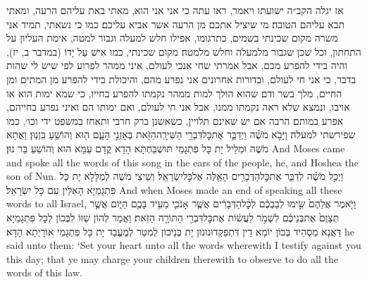 {\quad {} אז יגלה הקב״ה ישועתו ויאמר, ראו עתה כי אני אני הוא, מאתי באת עליהם הרעה, ומאתי תבא עליהם הטובה׃\quad {} מי שיציל אתכם מן הרעה אשר אביא עליכם׃\quad {} כמו כי נשאתי, תמיד אני משרה מקום שכינתי בשמים, כתרגומו, אפילו חלש למעלה וגבור למטה, אימת העליון על התחתון, וכל שכן שגבור מלמעלה וחלש מלמטה׃\quad {} מקום שכינתי, כמו אִישׁ עַל יָדוֹ (במדבר ב, יז), והיה בידי להפרע מכם, אבל אמרתי שחי אנכי לעולם, איני ממהר לפרוע לפי שיש לי שהות בדבר, כי אני חי לעולם, ובדורות אחרונים אני נפרע מהם, והיכולת בידי להפרע מן המתים ומן החיים, מלך בשר ודם שהוא הולך למות ממהר נקמתו להפרע בחייו, כי שמא ימות הוא או אויבו, ונמצא שלא ראה נקמתו ממנו, אבל אני חי לעולם, ואם ימותו הם ואיני נפרע בחייהם, אפרע במותם׃\quad {} הרבה אם יש שאינם תלויין, כשאשנן ברק חרבי ותאחז במשפט ידי וכו׳, כמו שפירשתי למעלה׃}
{וַיָּבֹ֣א מֹשֶׁ֗ה וַיְדַבֵּ֛ר אֶת\maqqaf כׇּל\maqqaf דִּבְרֵ֥י הַשִּׁירָֽה\maqqaf הַזֹּ֖את בְּאׇזְנֵ֣י הָעָ֑ם ה֖וּא וְהוֹשֵׁ֥עַ בִּן\maqqaf נֽוּן׃}
{וַאֲתָא מֹשֶׁה וּמַלֵּיל יָת כָּל פִּתְגָמֵי תּוּשְׁבַּחְתָּא הָדָא קֳדָם עַמָּא הוּא וְהוֹשֵׁעַ בַּר נוּן׃}
{And Moses came and spoke all the words of this song in the ears of the people, he, and Hoshea the son of Nun.}{}
{וַיְכַ֣ל מֹשֶׁ֗ה לְדַבֵּ֛ר אֶת\maqqaf כׇּל\maqqaf הַדְּבָרִ֥ים הָאֵ֖לֶּה אֶל\maqqaf כׇּל\maqqaf יִשְׂרָאֵֽל׃}
{וְשֵׁיצֵי מֹשֶׁה לְמַלָּלָא יָת כָּל פִּתְגָמַיָּא הָאִלֵּין עִם כָּל יִשְׂרָאֵל׃}
{And when Moses made an end of speaking all these words to all Israel,}{}
{וַיֹּ֤אמֶר אֲלֵהֶם֙ שִׂ֣ימוּ לְבַבְכֶ֔ם לְכׇ֨ל\maqqaf הַדְּבָרִ֔ים אֲשֶׁ֧ר אָנֹכִ֛י מֵעִ֥יד בָּכֶ֖ם הַיּ֑וֹם אֲשֶׁ֤ר תְּצַוֻּם֙ אֶת\maqqaf בְּנֵיכֶ֔ם לִשְׁמֹ֣ר לַעֲשׂ֔וֹת אֶת\maqqaf כׇּל\maqqaf דִּבְרֵ֖י הַתּוֹרָ֥ה הַזֹּֽאת׃}
{וַאֲמַר לְהוֹן שַׁוּוֹ לִבְּכוֹן לְכָל פִּתְגָמַיָּא דַּאֲנָא מַסְהֵיד בְּכוֹן יוֹמָא דֵין דִּתְפַקְּדוּנוּנוּן יָת בְּנֵיכוֹן לְמִטַּר לְמֶעֱבַד יָת כָּל פִּתְגָמֵי אוֹרָיְתָא הָדָא׃}
{he said unto them: ‘Set your heart unto all the words wherewith I testify against you this day; that ye may charge your children therewith to observe to do all the words of this law.}{}
